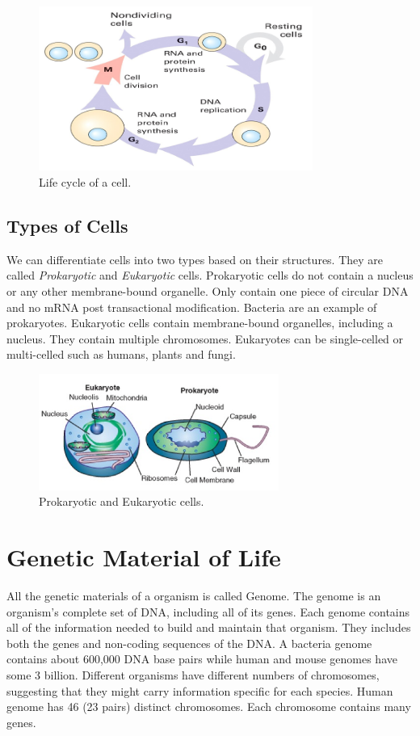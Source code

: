 \begin{figure}[!tb]
	\centering
	\includegraphics[width=0.8\textwidth]{figures/cellcycle}
	\caption{Life cycle of a cell.}
	\label{fig:cellcycle}
\end{figure}

\subsection{Types of Cells}
We can differentiate cells into two types based on their
structures. They are called \textit{Prokaryotic} and \textit{Eukaryotic} cells.
Prokaryotic cells do not contain a nucleus or any other membrane-bound organelle.
Only contain one piece of circular DNA and no mRNA post transactional modification.
Bacteria are an example of prokaryotes.
Eukaryotic cells contain membrane-bound organelles, including a nucleus. 
They contain multiple chromosomes. Eukaryotes can be single-celled or multi-celled such as humans, plants and fungi.

\begin{figure}[H]
	\centering
	\includegraphics[width=0.7\textwidth]{figures/celltype}
	\caption{Prokaryotic and Eukaryotic cells.}
	\label{fig:celltype}
\end{figure}

\section{Genetic Material of Life}
All the genetic materials of a organism is called Genome.
The genome is an organism’s complete set of DNA, including all of its genes. 
Each genome contains all of the information needed to build and maintain that organism.
They includes both the genes and non-coding sequences of the DNA.
A bacteria genome contains about 600,000 DNA base pairs while
human and mouse genomes have some 3 billion. Different organisms have different numbers of chromosomes, suggesting that they might carry information specific for each species. Human genome has 46 (23 pairs) distinct chromosomes. Each chromosome contains many genes. 


